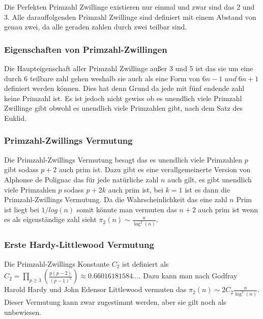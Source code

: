 Die Perfekten Primzahl Zwillinge existieren nur einmal und zwar sind das 2 und 3. Alle darauffolgenden Primzahl Zwillinge sind definiert mit einem Abstand von genau zwei, da alle geraden zahlen durch zwei teilbar sind. 
\subsubsection{Eigenschaften von Primzahl-Zwillingen}
Die Haupteigenschaft aller Primzahl Zwillinge außer 3 und 5 ist das sie um eine durch 6 teilbare zahl gehen weshalb sie auch als eine Form von 
$6n-1\;und\;6n+1$ definiert werden können. Dies hat denn Grund da jede mit fünf endende zahl keine Primzahl ist. Es ist jedoch nicht gewiss ob es unendlich viele Primzahl Zwillinge gibt obwohl es unendlich viele Primzahlen gibt, nach dem Satz des Euklid.
\subsubsection{Primzahl-Zwillings Vermutung}
Die Primzahl-Zwillings Vermutung besagt das es unendlich viele Primzahlen $p$ gibt sodass $p+2$ auch prim ist. Dazu gibt es eine verallgemeinerte Version von Alphonse de Polignac das für jede natürliche zahl $n$ auch gilt, es gibt unendlich viele Primzahlen $p$ sodass $p+2k$ auch prim ist, bei $k=1$ ist es dann die Primzahl-Zwillings Vermutung. Da die Wahrscheinlichkeit das eine zahl $n$ Prim ist liegt bei $1/log(n)$ somit könnte man vermuten das $n+2$ auch prim ist wenn es als eigenständige zahl sieht $\pi_2(n)\sim\frac{n}{\log^2(n)}$.
\subsubsection{Erste Hardy-Littlewood Vermutung}
Die Primzahl-Zwillings Konstante $C_2$ ist definiert als $C_2=\prod\limits_{p\geq3}(\frac{p(p-2)}{(p-1)^2})\approx0.66016181584...$.
Dazu kann man nach Godfray Harold Hardy und John Edensor Littlewood vermuten das $\pi_2(n)\sim2C_2\frac{n}{\log^2(n)}$.
Dieser Vermutung kann zwar zugestimmt werden, aber sie gilt noch als unbewiesen.